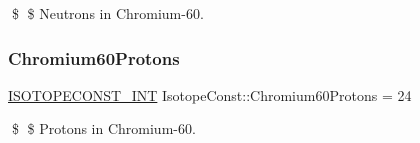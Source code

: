 \$ \$ Neutrons in Chromium-\/60. \mbox{\label{group___isotope_const-_chromium-_cr60_gaf5fca7694e3d19ee13c1662add645c37}} 
\subsubsection{\texorpdfstring{Chromium60\+Protons}{Chromium60Protons}}
{\footnotesize\ttfamily \mbox{\hyperlink{group___isotope_const-_macros_ga5f18360b3e99483a35c32d789e62621c}{I\+S\+O\+T\+O\+P\+E\+C\+O\+N\+S\+T\+\_\+\+I\+NT}} Isotope\+Const\+::\+Chromium60\+Protons = 24}

\$ \$ Protons in Chromium-\/60. 